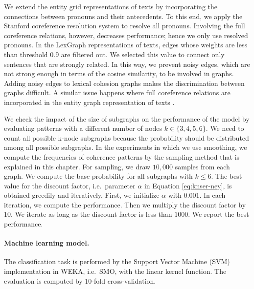 We extend the entity grid representations of texts by incorporating the connections between pronouns and their antecedents. 
To this end, we apply the Stanford coreference resolution system \cite{leeheeyoung13} to resolve all pronouns. 
Involving the full coreference relations, however, decreases performance; hence we only use resolved pronouns. 
In the LexGraph representations of texts, edges whose weights are less than threshold $0.9$ are filtered out. 
We selected this value to connect only sentences that are strongly related. 
In this way, we prevent noisy edges, which are not strong enough in terms of the cosine similarity, to be involved in graphs. 
Adding noisy edges to lexical cohesion graphs makes the discrimination between graphs difficult.
A similar issue happens where full coreference relations are incorporated in the entity graph representation of texts \cite{guinaudeau13}.   

We check the impact of the size of subgraphs on the performance of the model by evaluating patterns with a different number of nodes $k \in \lbrace3,4,5,6\rbrace$. 
We need to count all possible k-node subgraphs because the probability should be distributed among all possible subgraphs.  
In the experiments in which we use smoothing, we compute the frequencies of coherence patterns by the sampling method that is explained in this chapter.  
For sampling, we draw $10,000$ samples from each graph. 
We compute the base probability for all subgraphs with $k \leq 6$.  
The best value for the discount factor, i.e.\ parameter $\alpha$ in Equation \ref{eq:knser-ney}, is obtained greedily and iteratively.   
First, we initialize $\alpha$ with $0.001$. 
In each iteration, we compute the performance. 
Then we multiply the discount factor by $10$. 
We iterate as long as the discount factor is less than $1000$. 
We report the best performance.
 
\paragraph{Machine learning model.}
The classification task is performed by the Support Vector Machine (SVM) implementation in WEKA, i.e.\ SMO, with the linear kernel function. 
The evaluation is computed by \mbox{10-fold} \mbox{cross-validation}. 

